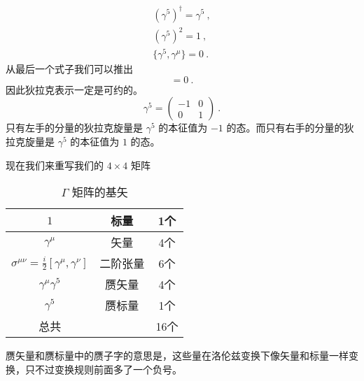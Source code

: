 \begin{align}
(\gamma^5)^\dagger = \gamma^5~, \\
(\gamma^5)^2 = 1~, \\
\{\gamma^5,\gamma^\mu\}=0~. 
\end{align}
从最后一个式子我们可以推出
\begin{equation}
[\gamma^5,S^{\mu\nu}] = 0~.
\end{equation}
因此狄拉克表示一定是可约的。
\begin{equation}
\gamma^5 = \begin{pmatrix}
-1 & 0 \\ 0 & 1 
\end{pmatrix}~.
\end{equation}
只有左手的分量的狄拉克旋量是 $\gamma^5$ 的本征值为 $-1$ 的态。而只有右手的分量的狄拉克旋量是 $\gamma^5$ 的本征值为 $1$ 的态。

现在我们来重写我们的 $4\times 4$ 矩阵
\begin{table}[ht]
\centering
\caption{$\Gamma$ 矩阵的基矢}\label{tab_diracm_2}
\begin{tabular}{|c|c|c|}
\hline
$1$ &标量& 1个 \\
\hline
$\gamma^\mu$ &矢量& 4个 \\
\hline
$\sigma^{\mu\nu}=\frac{i}{2}[\gamma^\mu,\gamma^\nu]$ &二阶张量& 6个 \\
\hline
$\gamma^{\mu}\gamma^5 $ &赝矢量& 4个 \\
\hline
$\gamma^{5} $ &赝标量& 1个 \\
\hline
总共 && 16个 \\
\hline
\end{tabular}
\end{table}
赝矢量和赝标量中的赝子字的意思是，这些量在洛伦兹变换下像矢量和标量一样变换，只不过变换规则前面多了一个负号。

